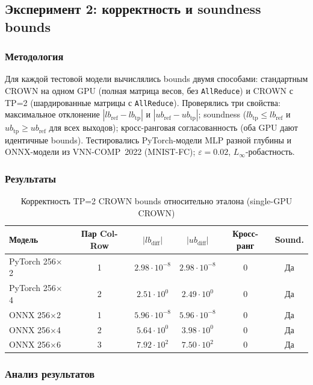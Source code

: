 \subsection{Эксперимент 2: корректность и soundness bounds}

\subsubsection{Методология}

Для каждой тестовой модели вычислялись bounds двумя способами:
стандартным CROWN на одном GPU (полная матрица весов, без
\texttt{AllReduce}) и CROWN с TP=2 (шардированные матрицы с
\texttt{AllReduce}).
Проверялись три свойства: максимальное отклонение
$|lb_{\text{ref}} - lb_{\text{tp}}|$ и $|ub_{\text{ref}} - ub_{\text{tp}}|$;
soundness ($lb_{\text{tp}} \leq lb_{\text{ref}}$ и
$ub_{\text{tp}} \geq ub_{\text{ref}}$ для всех выходов);
кросс-ранговая согласованность (оба GPU дают идентичные bounds).
Тестировались PyTorch-модели MLP разной глубины и ONNX-модели
из VNN-COMP~2022 (MNIST-FC)\cite{arXiv2212VNNCOMP2022};
$\varepsilon = 0.02$, $L_\infty$-робастность.

\subsubsection{Результаты}

\begin{table}[htbp]
\centering
\caption{Корректность TP=2 CROWN bounds относительно эталона
(single-GPU CROWN)}
\label{tab:tp-correctness}
\begin{tabular}{lccccc}
\toprule
Модель & Пар Col-Row & $|lb_{\text{diff}}|$ & $|ub_{\text{diff}}|$
    & Кросс-ранг & Sound. \\
\midrule
PyTorch 256$\times$2 & 1 & $2.98 \cdot 10^{-8}$ & $2.98 \cdot 10^{-8}$ & 0 & Да \\
PyTorch 256$\times$4 & 2 & $2.51 \cdot 10^{0}$  & $2.49 \cdot 10^{0}$  & 0 & Да \\
ONNX 256$\times$2    & 1 & $5.96 \cdot 10^{-8}$ & $5.96 \cdot 10^{-8}$ & 0 & Да \\
ONNX 256$\times$4    & 2 & $5.64 \cdot 10^{0}$  & $3.98 \cdot 10^{0}$  & 0 & Да \\
ONNX 256$\times$6    & 3 & $7.92 \cdot 10^{2}$  & $7.50 \cdot 10^{2}$  & 0 & Да \\
\bottomrule
\end{tabular}
\end{table}

\subsubsection{Анализ результатов}

